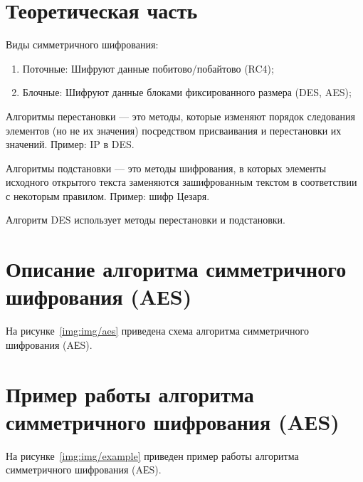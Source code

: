 \chapter{Теоретическая часть}

Виды симметричного шифрования:
\begin{enumerate}[label={\arabic*)}]
	\item Поточные: Шифруют данные побитово/побайтово (RC4);
	\item Блочные: Шифруют данные блоками фиксированного размера (DES, AES);	
\end{enumerate}

Алгоритмы перестановки — это методы, которые изменяют порядок следования элементов (но не их значения) посредством присваивания и перестановки их значений. Пример: IP в DES.

Алгоритмы подстановки — это методы шифрования, в которых элементы исходного открытого текста заменяются зашифрованным текстом в соответствии с некоторым правилом. Пример: шифр Цезаря.

Алгоритм DES использует методы перестановки и подстановки.

\chapter{Описание алгоритма симметричного шифрования (AЕS)}


На рисунке~\ref{img:img/aes} приведена схема алгоритма симметричного шифрования (AЕS).

\FloatBarrier
{}
\FloatBarrier



\chapter{Пример работы алгоритма симметричного шифрования (AЕS)}

На рисунке~\ref{img:img/example} приведен пример работы алгоритма симметричного шифрования (AЕS).

\FloatBarrier
{}
\FloatBarrier

